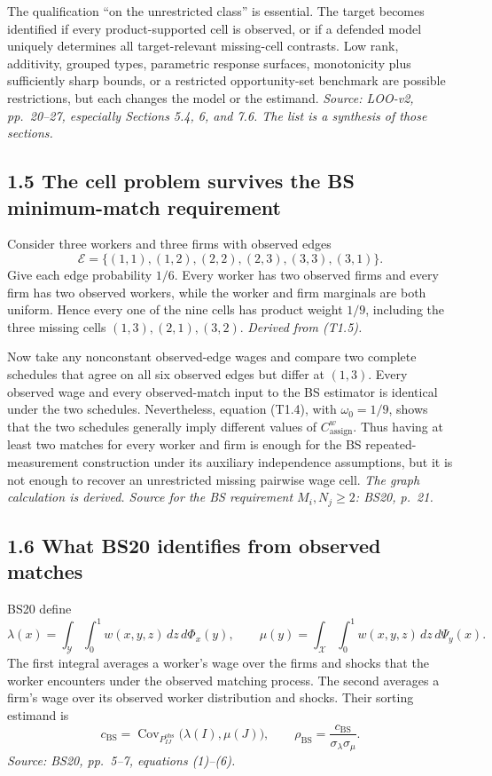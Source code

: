 \documentclass[11pt]{article}
\begin{document}
The qualification ``on the unrestricted class'' is essential.  The target
becomes identified if every product-supported cell is observed, or if a
defended model uniquely determines all target-relevant missing-cell contrasts.
Low rank, additivity, grouped types, parametric response surfaces, monotonicity
plus sufficiently sharp bounds, or a restricted opportunity-set benchmark are
possible restrictions, but each changes the model or the estimand.
\textit{Source: LOO-v2, pp.\ 20--27, especially Sections 5.4, 6, and 7.6.
The list is a synthesis of those sections.}

\subsection{1.5 The cell problem survives the BS minimum-match requirement}

Consider three workers and three firms with observed edges
\[
\mathcal E
=\{(1,1),(1,2),(2,2),(2,3),(3,3),(3,1)\}.
\tag{T1.5}
\]
Give each edge probability \(1/6\).  Every worker has two observed firms and
every firm has two observed workers, while the worker and firm marginals are
both uniform.  Hence every one of the nine cells has product weight \(1/9\),
including the three missing cells \((1,3),(2,1),(3,2)\).
\textit{Derived from (T1.5).}

Now take any nonconstant observed-edge wages and compare two complete schedules
that agree on all six observed edges but differ at \((1,3)\).  Every observed
wage and every observed-match input to the BS estimator is identical under the
two schedules.  Nevertheless, equation (T1.4), with
\(\omega_0=1/9\), shows that the two schedules generally imply different
values of \(C^w_{\mathrm{assign}}\).  Thus having at least two matches for
every worker and firm is enough for the BS repeated-measurement construction
under its auxiliary independence assumptions, but it is not enough to recover
an unrestricted missing pairwise wage cell.
\textit{The graph calculation is derived.  Source for the BS requirement
\(M_i,N_j\geq2\): BS20, p.\ 21.}

\subsection{1.6 What BS20 identifies from observed matches}

BS20 define
\[
\lambda(x)
=\int_{\mathcal Y}\int_0^1w(x,y,z)\,dz\,d\Phi_x(y),
\qquad
\mu(y)
=\int_{\mathcal X}\int_0^1w(x,y,z)\,dz\,d\Psi_y(x).
\tag{T1.6}
\]
The first integral averages a worker's wage over the firms and shocks that the
worker encounters under the observed matching process.  The second averages a
firm's wage over its observed worker distribution and shocks.  Their sorting
estimand is
\[
c_{\mathrm{BS}}
=\operatorname{Cov}_{P^{\mathrm{obs}}_{IJ}}
\bigl(\lambda(I),\mu(J)\bigr),
\qquad
\rho_{\mathrm{BS}}
=\frac{c_{\mathrm{BS}}}{\sigma_\lambda\sigma_\mu}.
\tag{T1.7}
\]
\textit{Source: BS20, pp.\ 5--7, equations (1)--(6).}
\end{document}
